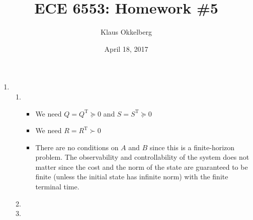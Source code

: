 \documentclass[letterpaper,11pt,titlepage]{article}
\newcommand{\trans}{^\text{T}}
\begin{document}
\title{ECE 6553: Homework \#5}
\author{Klaus Okkelberg}
\date{April 18, 2017}
\maketitle


\begin{enumerate}[leftmargin=0pt]

    \item 
        \begin{enumerate}
            \item \begin{itemize}
                    \item We need $Q=Q\trans\succcurlyeq 0$ and $S=S\trans\succcurlyeq 0$
                    \item We need $R=R\trans\succ 0$
                    \item There are no conditions on $A$ and $B$ since this is a finite-horizon problem. The observability and controllability of the system does not matter since the cost and the norm of the state are guaranteed to be finite (unless the initial state has infinite norm) with the finite terminal time.
                \end{itemize}
            \item 
            \item 
        \end{enumerate}

\end{enumerate}
\end{document}

